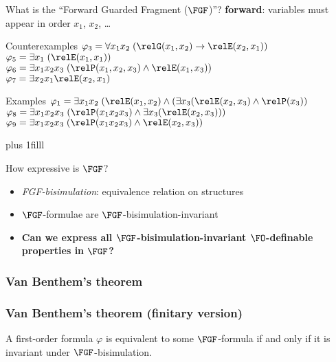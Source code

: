 \documentclass[aspectratio=169]{beamer}
\begin{document}
\begin{frame}{What is the ``Forward Guarded Fragment ($\FGF$)''?}
  \textbf{forward}: variables must appear in order $x_{1}$, $x_2$, \ldots
  \vspace{0.5em}
  \begin{alertblock}{Counterexamples}
    $\varphi_{3} = \forall{x_{1}x_{2}}\; (\relG(x_{1}, x_{2}) \to \relE(x_{2}, x_{1}))$ \\[1em]
    $\varphi_{5} = \exists{x_{1}}\; (\relE(x_{1}, x_{1}))$ \\[1em]
    $\varphi_{6} = \exists{x_{1}x_{2}x_{3}}\; (\relP(x_{1}, x_{2}, x_{3}) \land \relE(x_{1}, x_{3}))$ \\[1em]
    $\varphi_{7} = \exists{x_{2}x_{1}} \relE(x_{2}, x_{1})$
  \end{alertblock}

  \begin{exampleblock}{Examples}
    $\varphi_{1} = \exists{x_{1}x_{2}}\; (\relE(x_{1}, x_{2}) \land (\exists{x_{3}}(\relE(x_{2}, x_{3}) \land \relP(x_{3}))$ \\[1em]

    $\varphi_{8} = \exists{x_{1}x_{2}x_{3}}\; (\relP(x_{1}x_{2}x_{3}) \land \exists{x_{3}}(\relE(x_{2}, x_{3})))$ \\[1em]
    $\varphi_{9} = \exists{x_{1}x_{2}x_{3}}\; (\relP(x_{1}x_{2}x_{3}) \land \relE(x_{2}, x_{3}))$ \\[1em]
  \end{exampleblock}

  \vskip 0pt plus 1filll
\end{frame}

\begin{frame}{How expressive is $\FGF$?}
  \begin{center}
    
  \end{center}
  \begin{itemize}
    \item \emph{FGF-bisimulation}: equivalence relation on structures
    \item $\FGF$-formulae are $\FGF$-bisimulation-invariant
    \item \textbf{Can we express all $\FGF$-bisimulation-invariant $\FO$-definable properties in $\FGF$?}
  \end{itemize}
\end{frame}

\begin{frame}\frametitle<1>{Van Benthem's theorem}\frametitle<2>{Van Benthem's theorem (finitary version)}
  \begin{theorem}
    A first-order formula $\varphi$ is equivalent to some $\FGF$-formula if and only if it is invariant under $\FGF$-bisimulation.
  \end{theorem}
\end{frame}
\end{document}
